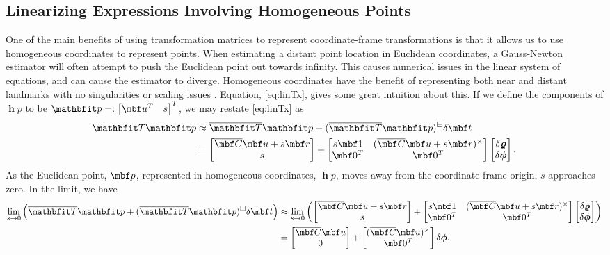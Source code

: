 \documentclass[11pt,a4,oneside]{article}
\begin{document}
\subsection{Linearizing Expressions Involving Homogeneous Points\label{s:homo}}
One of the main benefits of using transformation matrices to represent coordinate-frame transformations is that it allows us to use homogeneous coordinates to represent points. 
When estimating a distant point location in Euclidean coordinates, a Gauss-Newton estimator will often attempt to push the Euclidean point out towards infinity. This causes numerical issues in the linear system of equations, and can cause the estimator to diverge.
Homogeneous coordinates have the benefit of representing both near and distant landmarks with no singularities or scaling issues \citep{Triggs0000}.
Equation, \eqref{eq:linTx}, gives some great intuition about this. If we define the components of $\mbfh p$ to be $\mbfh p =: \bbm \mbf u^T & s \ebm^T$, we may restate \eqref{eq:linTx} as
\begin{subequations}
\begin{flalign}
	\mbfh T \mbfh p & \approx \mbfhbar T \mbfh p +
			(\mbfhbar T \mbfh p)^\boxminus
			\mbfdel t \\
                        & = 
                        \bbm
                          \mbfbar C \mbf u + s \mbf r\\
                          s
                        \ebm
                        + 
                        \bbm
  			  s\mbf 1  & (\mbfbar C \mbf u + s\mbf r)^\times\\
                          \mbf 0^T & \mbf 0^T
                        \ebm
                        \bbm
			  \mbsdel \varrho\\
                          \mbsdel \phi
                        \ebm
                      \label{eq:linTx2}.
\end{flalign}
\end{subequations}
As the Euclidean point, $\mbf p$, represented in homogeneous coordinates, $\mbfh p$, moves away from the coordinate frame origin, $s$ approaches zero. In the limit, we have
\begin{subequations}
\begin{flalign}
	\lim_{s \rightarrow 0} 
	\left (
		 \mbfhbar T \mbfh p +
			(\mbfhbar T \mbfh p)^\boxminus
			\mbfdel t
	\right)
	&\approx 
	\lim_{s \rightarrow 0}
	\left(
                \bbm
                  \mbfbar C \mbf u + s \mbf r\\
                  s
                \ebm
	        + 
		\bbm
			s\mbf 1  & (\mbfbar C \mbf u + s\mbf r)^\times\\
			\mbf 0^T & \mbf 0^T
		\ebm
		\bbm
			\mbsdel \varrho\\
			\mbsdel \phi
		\ebm
	\right)\\
		&=
		\bbm
			\mbfbar C \mbf u\\
			0
		\ebm
		 +
		\bbm
			(\mbfbar C \mbf u)^\times\\
			\mbf 0^T
		\ebm
		\mbsdel \phi.
\end{flalign}
\end{subequations}
\end{document}
